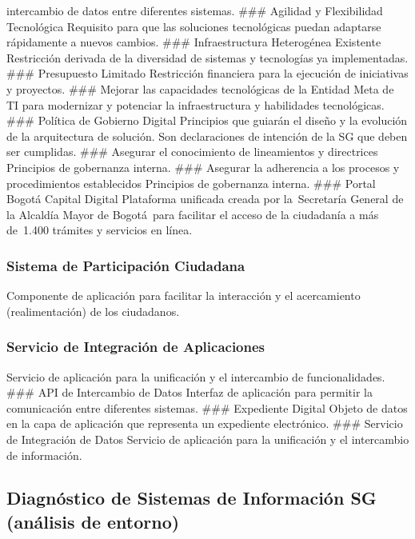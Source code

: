 \documentclass[
	a4paper, %
	12pt, %
]{include/CSSullivanBusinessReport}
\begin{document}
\begin{itemize}
  intercambio de datos entre diferentes sistemas. \#\#\# Agilidad y
  Flexibilidad Tecnológica Requisito para que las soluciones
  tecnológicas puedan adaptarse rápidamente a nuevos cambios. \#\#\#
  Infraestructura Heterogénea Existente Restricción derivada de la
  diversidad de sistemas y tecnologías ya implementadas. \#\#\#
  Presupuesto Limitado Restricción financiera para la ejecución de
  iniciativas y proyectos. \#\#\# Mejorar las capacidades tecnológicas
  de la Entidad Meta de TI para modernizar y potenciar la
  infraestructura y habilidades tecnológicas. \#\#\# Política de
  Gobierno Digital Principios que guiarán el diseño y la evolución de la
  arquitectura de solución. Son declaraciones de intención de la SG que
  deben ser cumplidas. \#\#\# Asegurar el conocimiento de lineamientos y
  directrices Principios de gobernanza interna. \#\#\# Asegurar la
  adherencia a los procesos y procedimientos establecidos Principios de
  gobernanza interna. \#\#\# Portal Bogotá Capital Digital Plataforma
  unificada creada por la~Secretaría General de la Alcaldía Mayor de
  Bogotá~para facilitar el acceso de la ciudadanía a más de~1.400
  trámites y servicios en línea.
\end{itemize}

\subsubsection{Sistema de Participación
Ciudadana}\label{sec:sistema-de-participaciuxf3n-ciudadana}

Componente de aplicación para facilitar la interacción y el acercamiento
(realimentación) de los ciudadanos.

\subsubsection{Servicio de Integración de
Aplicaciones}\label{sec:servicio-de-integraciuxf3n-de-aplicaciones}

Servicio de aplicación para la unificación y el intercambio de
funcionalidades. \#\#\# API de Intercambio de Datos Interfaz de
aplicación para permitir la comunicación entre diferentes sistemas.
\#\#\# Expediente Digital Objeto de datos en la capa de aplicación que
representa un expediente electrónico. \#\#\# Servicio de Integración de
Datos Servicio de aplicación para la unificación y el intercambio de
información.

\subsection{Diagnóstico de Sistemas de Información SG (análisis de
entorno)}\label{sec:diagnuxf3stico-de-sistemas-de-informaciuxf3n-sg-anuxe1lisis-de-entorno}
\end{document}
